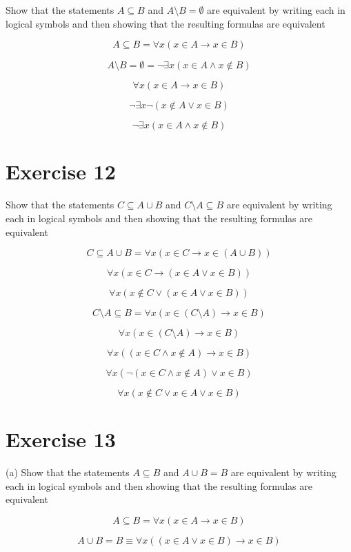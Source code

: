 \documentclass[11pt]{article}
\newcommand{\then}{\rightarrow}
\begin{document}
Show that the statements $A \subseteq B$ and $A \setminus B = \emptyset$ are 
equivalent by writing each in logical symbols and then showing that the 
resulting formulas are equivalent 

$$A \subseteq B = \forall x (x \in A \then x \in B)$$

$$A \setminus B = \emptyset = \neg \exists x (x \in A \wedge x \notin B)$$

$$\forall x (x \in A \then x \in B)$$

$$\neg \exists x \neg (x \notin A \vee x \in B)$$

$$\neg \exists x (x \in A \wedge x \notin B)$$

\section*{Exercise 12}

Show that the statements $C \subseteq A \cup B$ and $C \setminus A \subseteq B$
are equivalent by writing each in logical symbols and then showing that the 
resulting formulas are equivalent 

$$C \subseteq A \cup B = \forall x (x \in C \then x \in (A \cup B))$$

$$\forall x (x \in C \then (x \in A \vee x \in B))$$

$$\forall x (x \notin C \vee (x \in A \vee x \in B))$$

$$C \setminus A \subseteq B = \forall x (x \in (C \setminus A) \then x \in B)$$

$$\forall x (x \in (C \setminus A) \then x \in B)$$

$$\forall x ((x \in C \wedge x \notin A) \then x \in B)$$

$$\forall x (\neg (x \in C \wedge x \notin A) \vee x \in B)$$

$$\forall x (x \notin C \vee x \in A \vee x \in B)$$

\section*{Exercise 13}

\noindent (a) Show that the statements $A \subseteq B$ and $A \cup B = B$ are 
equivalent by writing each in logical symbols and then showing that the 
resulting formulas are equivalent

$$A \subseteq B = \forall x (x \in A \then x \in B)$$

$$A \cup B = B \equiv \forall x ((x \in A \vee x \in B) \then x \in B)$$
\end{document}
